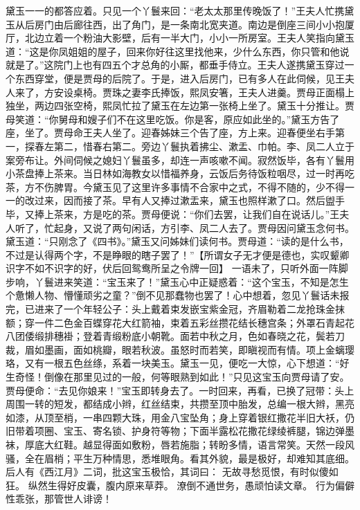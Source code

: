\documentclass[12pt,oneside]{book}
\begin{document}
黛玉一一的都答应着。只见一个丫鬟来回：“老太太那里传晚饭了！”王夫人忙携黛玉从后房门由后廊往西，出了角门，是一条南北宽夹道。南边是倒座三间小小抱厦厅，北边立着一个粉油大影壁，后有一半大门，小小一所房室。王夫人笑指向黛玉道：“这是你凤姐姐的屋子，回来你好往这里找他来，少什么东西，你只管和他说就是了。”这院门上也有四五个才总角的小厮，都垂手侍立。王夫人遂携黛玉穿过一个东西穿堂，便是贾母的后院了。于是，进入后房门，已有多人在此伺候，见王夫人来了，方安设桌椅。贾珠之妻李氏捧饭，熙凤安箸，王夫人进羹。贾母正面榻上独坐，两边四张空椅，熙凤忙拉了黛玉在左边第一张椅上坐了。黛玉十分推让。贾母笑道：“你舅母和嫂子们不在这里吃饭。你是客，原应如此坐的。”黛玉方告了座，坐了。贾母命王夫人坐了。迎春姊妹三个告了座，方上来。迎春便坐右手第一，探春左第二，惜春右第二。旁边丫鬟执着拂尘、漱盂、巾帕。李、凤二人立于案旁布让。外间伺候之媳妇丫鬟虽多，却连一声咳嗽不闻。寂然饭毕，各有丫鬟用小茶盘捧上茶来。当日林如海教女以惜福养身，云饭后务待饭粒咽尽，过一时再吃茶，方不伤脾胃。今黛玉见了这里许多事情不合家中之式，不得不随的，少不得一一的改过来，因而接了茶。早有人又捧过漱盂来，黛玉也照样漱了口。然后盥手毕，又捧上茶来，方是吃的茶。贾母便说：“你们去罢，让我们自在说话儿。”王夫人听了，忙起身，又说了两句闲话，方引李、凤二人去了。贾母因问黛玉念何书。黛玉道：“只刚念了《四书》。”黛玉又问姊妹们读何书。贾母道：“读的是什么书，不过是认得两个字，不是睁眼的瞎子罢了！”【所谓女子无才便是德也，实叹颦卿识字不如不识字的好，伏后回鸳鸯所呈之令牌一回】
一语未了，只听外面一阵脚步响，丫鬟进来笑道：“宝玉来了！”黛玉心中正疑惑着：“这个宝玉，不知是怎生个惫懒人物、懵懂顽劣之童？”倒不见那蠢物也罢了！心中想着，忽见丫鬟话未报完，已进来了一个年轻公子：头上戴着束发嵌宝紫金冠，齐眉勒着二龙抢珠金抹额；穿一件二色金百蝶穿花大红箭袖，束着五彩丝攒花结长穗宫条；外罩石青起花八团倭缎排穗褂；登着青缎粉底小朝靴。面若中秋之月，色如春晓之花，鬓若刀裁，眉如墨画，面如桃瓣，眼若秋波。虽怒时而若笑，即瞋视而有情。项上金螭璎珞，又有一根五色丝绦，系着一块美玉。黛玉一见，便吃一大惊，心下想道：“好生奇怪！倒像在那里见过的一般，何等眼熟到如此！”只见这宝玉向贾母请了安。贾母便命：“去见你娘来！”宝玉即转身去了。一时回来，再看，已换了冠带：头上周围一转的短发，都结成小辫，红丝结束，共攒至顶中胎发，总编一根大辫，黑亮如漆，从顶至梢，一串四颗大珠，用金八宝坠角；身上穿着银红撒花半旧大袄，仍旧带着项圈、宝玉、寄名锁、护身符等物；下面半露松花撒花绿绫裤腿，锦边弹墨袜，厚底大红鞋。越显得面如敷粉，唇若施脂；转盼多情，语言常笑。天然一段风骚，全在眉梢；平生万种情思，悉堆眼角。看其外貌，最是极好，却难知其底细。后人有《西江月》二词，批这宝玉极恰，其词曰：
无故寻愁觅恨，有时似傻如狂。
纵然生得好皮囊，腹内原来草莽。
潦倒不通世务，愚顽怕读文章。
行为偏僻性乖张，那管世人诽谤！
\end{document}
